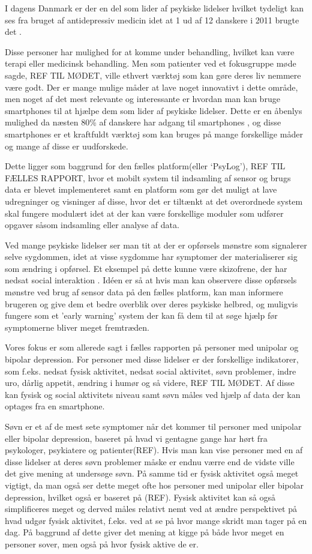 I dagens Danmark er der en del som lider af psykiske lidelser hvilket tydeligt kan ses fra bruget af antidepressiv medicin idet at 1 ud af 12 danskere i 2011 brugte det \citep{misc:forbrugAntidepressiva}. 

Disse personer har mulighed for at komme under behandling, hvilket kan være terapi eller medicinsk behandling.
Men som patienter ved et fokusgruppe møde sagde, REF TIL MØDET, ville ethvert værktøj som kan gøre deres liv nemmere være godt.
Der er mange mulige måder at lave noget innovativt i dette område, men noget af det mest relevante og interessante er hvordan man kan bruge smartphones til at hjælpe dem som lider af psykiske lidelser.
Dette er en åbenlys mulighed da næsten 80\% af danskere har adgang til smartphones \citep{misc:dstElektronik}, og disse smartphones er et kraftfuldt værktøj som kan bruges på mange forskellige måder og mange af disse er uudforskede.

Dette ligger som baggrund for den fælles platform(eller `PsyLog'), REF TIL FÆLLES RAPPORT, hvor et mobilt system til indsamling af sensor og brugs data er blevet implementeret samt en platform som gør det muligt at lave udregninger og visninger af disse, hvor det er tiltænkt at det overordnede system skal fungere modulært idet at der kan være forskellige moduler som udfører opgaver såsom indsamling eller analyse af data.

Ved mange psykiske lidelser ser man tit at der er opførsels mønstre som signalerer selve sygdommen, idet at visse sygdomme har symptomer der materialiserer sig som ændring i opførsel.
Et eksempel på dette kunne være skizofrene, der har nedsat social interaktion \citep{misc:negativeSymptomsSchizo}.
Idéen er så at hvis man kan observere disse opførsels mønstre ved brug af sensor data på den fælles platform, kan man informere brugeren og give dem et bedre overblik over deres psykiske helbred, og muligvis fungere som et 'early warning' system der kan få dem til at søge hjælp før symptomerne bliver meget fremtræden.

Vores fokus er som allerede sagt i fælles rapporten på personer med unipolar og bipolar depression. 
For personer med disse lidelser er der forskellige indikatorer, som f.eks. nedsat fysisk aktivitet, nedsat social aktivitet, søvn problemer, indre uro, dårlig appetit, ændring i humør og så videre, REF TIL MØDET.
Af disse kan fysisk og social aktivitets niveau samt søvn måles ved hjælp af data der kan optages fra en smartphone.

Søvn er et af de mest sete symptomer når det kommer til personer med unipolar eller bipolar depression, baseret på hvad vi gentagne gange har hørt fra psykologer, psykiatere og patienter(REF).
Hvis man kan vise personer med en af disse lidelser at deres søvn problemer måske er endnu værre end de vidste ville det give mening at undersøge søvn. 
På samme tid er fysisk aktivitet også meget vigtigt, da man også ser dette meget ofte hos personer med unipolar eller bipolar depression, hvilket også er baseret på (REF).
Fysisk aktivitet kan så også simplificeres meget og derved måles relativt nemt ved at ændre perspektivet på hvad udgør fysisk aktivitet, f.eks. ved at se på hvor mange skridt man tager på en dag.
På baggrund af dette giver det mening at kigge på både hvor meget en personer sover, men også på hvor fysisk aktive de er.